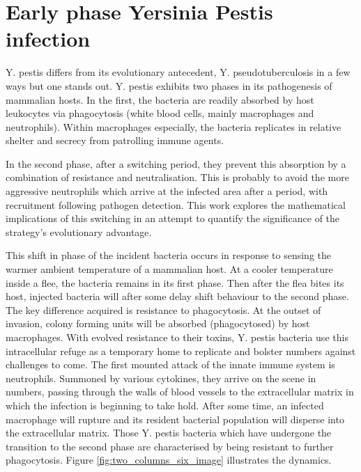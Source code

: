 \section{Early phase Yersinia Pestis infection}

Y. pestis differs from its evolutionary antecedent, Y. pseudotuberculosis in a few ways but one stands out. Y. pestis exhibits two phases in its pathogenesis of mammalian hosts. In the first, the bacteria are readily absorbed by host leukocytes via phagocytosis (white blood cells, mainly macrophages and neutrophils). Within macrophages especially, the bacteria replicates in relative shelter and secrecy from patrolling immune agents.\par
In the second phase, after a switching period, they prevent this absorption by a combination of resistance and neutralisation. This is probably to avoid the more aggressive neutrophils which arrive at the infected area after a period, with recruitment following pathogen detection. This work explores the mathematical implications of this switching in an attempt to quantify the significance of the strategy's evolutionary advantage.\par 


This shift in phase of the incident bacteria occurs in response to sensing the warmer ambient temperature of a mammalian host. At a cooler temperature inside a flee, the bacteria remains in its first phase. Then after the flea bites its host, injected bacteria will after some delay shift behaviour to the second phase. The key difference acquired is resistance to phagocytosis. At the outset of invasion, colony forming units will be absorbed (phagocytosed) by host macrophages. With evolved resistance to their toxins, Y. pestis bacteria use this intracellular refuge as a temporary home to replicate and bolster numbers against challenges to come. The first mounted attack of the innate immune system is neutrophils. Summoned by various cytokines, they arrive on the scene in numbers, passing through the walls of blood vessels to the extracellular matrix in which the infection is beginning to take hold. After some time, an infected macrophage will rupture and its resident bacterial population will disperse into the extracellular matrix. Those Y. pestis bacteria which have undergone the transition to the second phase are characterised by being resistant to further phagocytosis.  Figure \ref{fig:two_columns_six_image} illustrates the dynamics. 


